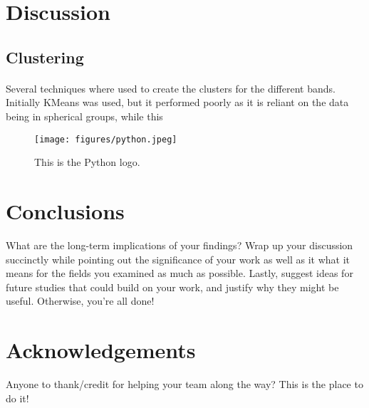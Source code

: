 \documentclass[12pt,twocolumn,letterpaper]{article}
\newcommand{\comment}[1]{}
\begin{document}
\section{Discussion}
\comment{
And here is the 'meat' of the paper, so to speak. This is where you interpret your results, pointing out interesting trends within your data and how they relate to your initial hypothesis. This is also the place to justify your methodology, if you're so inclined (i.e. Why did you specifically use a certain statistical test over another? Why this tool over that tool?). Lastly, you're going to want to discuss potential sources of error. Make sure to make explicit reference to figures/tables when discussing your data; it can be helpful to walk the reader through your own personal interpretation of each figure in order. See Figure \ref{fig:python-logo} for a picture of the Python logo. Although we recommend looking at past winning papers over at the STEM Fellowship Journal's website anyways, referring to those papers might prove most helpful when it comes to writing your discussion.}
\subsection{Clustering}
\paragraph{}
Several techniques where used to create the clusters for the different bands. Initially KMeans was used, but it performed poorly as it is reliant on the data being in spherical groups, while this

\begin{figure}
  \centering
  \texttt{[image: figures/python.jpeg]}
  \caption{This is the Python logo.}
  \label{fig:python-logo}
\end{figure}

\section*{Conclusions}
What are the long-term implications of your findings? Wrap up your discussion succinctly while pointing out the significance of your work as well as it what it means for the fields you examined as much as possible. Lastly, suggest ideas for future studies that could build on your work, and justify why they might be useful. Otherwise, you're all done!

\section*{Acknowledgements}
Anyone to thank/credit for helping your team along the way? This is the place to do it!


\end{document}
